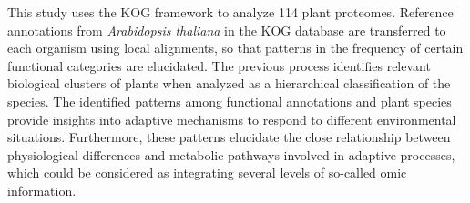 This study uses the KOG framework to analyze 114 plant 
proteomes. 
Reference annotations from \emph{Arabidopsis 
thaliana} in the KOG database are transferred to each 
organism using local alignments, so that patterns in the 
frequency of certain functional categories are elucidated.
The previous process identifies relevant biological clusters of 
plants when analyzed as a hierarchical classification of 
the species.
The identified patterns among functional annotations and 
plant species provide insights into adaptive 
mechanisms to respond to different environmental 
situations. Furthermore, these patterns elucidate the close 
relationship between physiological differences and metabolic 
pathways involved in adaptive processes, which could be 
considered as integrating several levels of so-called 
omic information.
